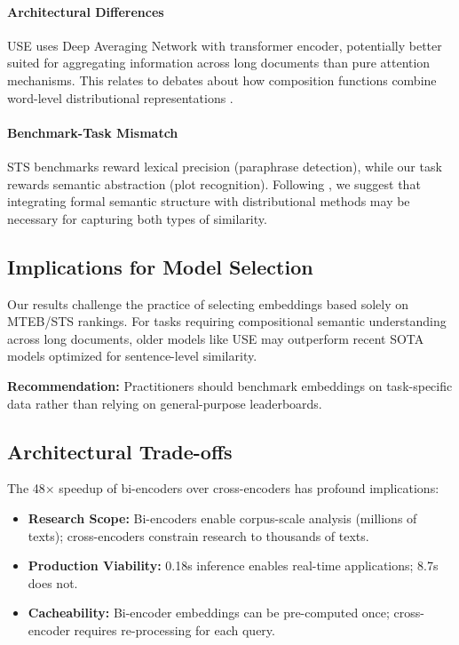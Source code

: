 \documentclass[11pt]{article}
\begin{document}
\paragraph{Architectural Differences} USE uses Deep Averaging Network with transformer encoder, potentially better suited for aggregating information across long documents than pure attention mechanisms. This relates to debates about how composition functions combine word-level distributional representations \cite{VanDerWerfITCDS2022}.

\paragraph{Benchmark-Task Mismatch} STS benchmarks reward lexical precision (paraphrase detection), while our task rewards semantic abstraction (plot recognition). Following \citet{Asher2024FormalDistributional}, we suggest that integrating formal semantic structure with distributional methods may be necessary for capturing both types of similarity.

\subsection{Implications for Model Selection}

Our results challenge the practice of selecting embeddings based solely on MTEB/STS rankings. For tasks requiring compositional semantic understanding across long documents, older models like USE may outperform recent SOTA models optimized for sentence-level similarity.

\textbf{Recommendation:} Practitioners should benchmark embeddings on task-specific data rather than relying on general-purpose leaderboards.

\subsection{Architectural Trade-offs}

The 48× speedup of bi-encoders over cross-encoders has profound implications:

\begin{itemize}
    \item \textbf{Research Scope:} Bi-encoders enable corpus-scale analysis (millions of texts); cross-encoders constrain research to thousands of texts.
    \item \textbf{Production Viability:} 0.18s inference enables real-time applications; 8.7s does not.
    \item \textbf{Cacheability:} Bi-encoder embeddings can be pre-computed once; cross-encoder requires re-processing for each query.
\end{itemize}
\end{document}
